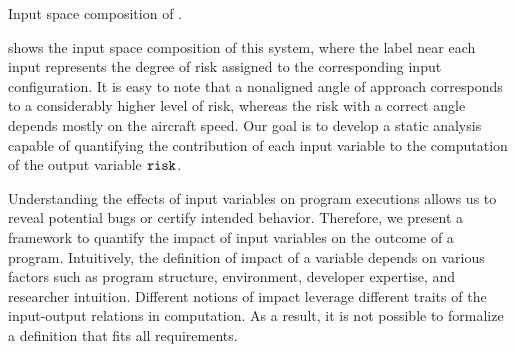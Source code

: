 \begin{marginfigure}
\centering
{}
\caption{Input space composition of .}
\end{marginfigure}

 shows the input space composition of this system, where the label near each input represents the degree of risk assigned to the corresponding input configuration.
It is easy to note that a nonaligned angle of approach corresponds to a considerably higher level of risk, whereas the risk with a correct angle depends mostly on the aircraft speed.
Our goal is to develop a static analysis capable of quantifying the contribution of each input variable to the computation of the output variable $\texttt{risk}{}$.


\newcommand{\exampleinput}[1][\defaultprogramexampleletter]{\textsc{Input}_{#1}}

Understanding the effects of input variables on program executions allows us to reveal potential bugs or certify intended behavior.
Therefore, we present a framework to quantify the impact of input variables on the outcome of a program.
Intuitively, the definition of impact of a variable depends on various factors such as program structure, environment, developer expertise, and researcher intuition.
Different notions of impact leverage different traits of the input-output relations in computation.
As a result, it is not possible to formalize a definition that fits all requirements.

